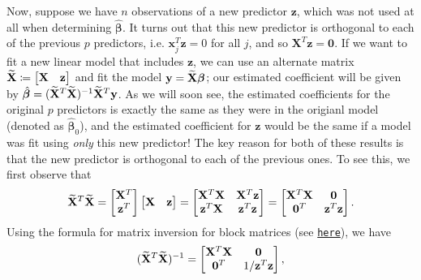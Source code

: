 \documentclass[10pt]{article}
\begin{document}
Now, suppose we have \(n\) observations of a new predictor \(\mathbf{z}\), which was not used at all when determining \(\hat{\bm{\beta}}\). 
It turns out that this new predictor is orthogonal to each of the previous \(p\) predictors, i.e. \(\mathbf{x}_j^T\mathbf{z} = 0\) for all \(j\), 
and so \(\mathbf{X}^T\mathbf{z} = \mathbf{0}\). If we want to fit a new linear model that includes \(\mathbf{z}\), we can use an alternate 
matrix \(\widetilde{\mathbf{X}} \coloneqq \begin{bmatrix}
    \mathbf{X} & \mathbf{z}
\end{bmatrix}\) and fit the model \(\mathbf{y} = \widetilde{\mathbf{X}} \bm{\beta}\); our estimated coefficient will be given by \(\hat{\bm{\beta}} = (\widetilde{\mathbf{X}}^T\widetilde{\mathbf{X}})^{-1}\widetilde{\mathbf{X}}^T\mathbf{y}\).
As we will soon see, the estimated coefficients for the original \(p\) predictors is exactly the same as they were in the origianl model (denoted as \(\hat{\bm{\beta}}_0\)), 
and the estimated coefficient for \(\mathbf{z}\) would be the same if a model was fit using \textsl{only} this new predictor!
The key reason for both of these results is that the new predictor is orthogonal to each of the previous ones. 
To see this, we first observe that 
\begin{align*}
    \widetilde{\mathbf{X}}^T\widetilde{\mathbf{X}}
    = \begin{bmatrix}
        \mathbf{X}^T \\ \mathbf{z}^T
    \end{bmatrix}
    \begin{bmatrix}
        \mathbf{X} & \mathbf{z}
    \end{bmatrix}
    = \begin{bmatrix}
        \mathbf{X}^T\mathbf{X} & \mathbf{X}^T\mathbf{z} \\
        \mathbf{z}^T \mathbf{X} & \mathbf{z}^T\mathbf{z}
    \end{bmatrix}
    = \begin{bmatrix}
        \mathbf{X}^T\mathbf{X} & \mathbf{0} \\
        \mathbf{0}^T & \mathbf{z}^T\mathbf{z}
    \end{bmatrix}.
\end{align*}
Using the formula for matrix inversion for block matrices (see \href{https://en.wikipedia.org/wiki/Block_matrix#Block_matrix_inversion}{\texttt{here}}), we have 
\begin{align*}
    (\widetilde{\mathbf{X}}^T\widetilde{\mathbf{X}})^{-1}
    = \begin{bmatrix}
        \mathbf{X}^T\mathbf{X} & \mathbf{0} \\
        \mathbf{0}^T & 1 / \mathbf{z}^T\mathbf{z}
    \end{bmatrix},
\end{align*}
\end{document}
